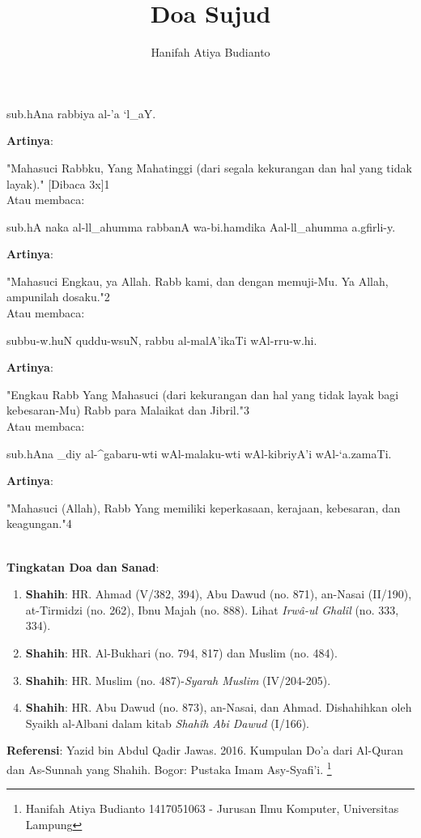\documentclass[a4paper,12pt]{article}
\title{\Large Doa Sujud}
\author{\calligra Hanifah Atiya Budianto}
\begin{document}
\sffamily
\maketitle 
\fullvocalize
{}
\begin{arabtext}
\noindent
sub.hAna rabbiya al-'a `l_aY.\\
\end{arabtext}
\noindent
\textbf{Artinya}:
\par
\indent
"Mahasuci Rabbku, Yang Mahatinggi (dari segala kekurangan dan hal yang 
tidak layak)." [Dibaca 3x]{\scriptsize 1}\\
\indent Atau membaca:
\begin{arabtext}
\noindent
sub.hA naka al-ll_ahumma rabbanA wa-bi.hamdika Aal-ll_ahumma a.gfirli-y.\\
\end{arabtext}
\noindent
\textbf{Artinya}:
\par
\indent
"Mahasuci Engkau, ya Allah. Rabb kami, dan dengan memuji-Mu. Ya Allah, 
ampunilah dosaku."{\scriptsize 2}\\
\indent Atau membaca:
\begin{arabtext}
\noindent
subbu-w.huN quddu-wsuN, rabbu al-malA'ikaTi wAl-rru-w.hi.\\
\end{arabtext}
\noindent
\textbf{Artinya}:
\par
\indent
"Engkau Rabb Yang Mahasuci (dari kekurangan dan hal yang tidak layak bagi 
kebesaran-Mu) Rabb para Malaikat dan Jibril."{\scriptsize 3}\\
\indent Atau membaca:
\begin{arabtext}
\noindent
sub.hAna _diy al-^gabaru-wti wAl-malaku-wti wAl-kibriyA'i wAl-`a.zamaTi.\\
\end{arabtext}
\noindent
\textbf{Artinya}:
\par
\indent
"Mahasuci (Allah), Rabb Yang memiliki keperkasaan, kerajaan, kebesaran, 
dan keagungan."{\scriptsize 4}\\\\
\par
\noindent
\textbf{Tingkatan Doa dan Sanad}:
\begin{enumerate}
\item \textbf{Shahih}: HR. Ahmad (V/382, 394), Abu Dawud (no. 871), 
an-Nasai (II/190), at-Tirmidzi (no. 262), Ibnu Majah (no. 888). Lihat 
\textit{Irw\^{a}-ul Ghal\^{i}l} (no. 333, 334).
\item \textbf{Shahih}: HR. Al-Bukhari (no. 794, 817) dan Muslim (no. 484).
\item \textbf{Shahih}: HR. Muslim (no. 487)-\textit{Syarah Muslim} 
(IV/204-205).
\item \textbf{Shahih}: HR. Abu Dawud (no. 873), an-Nasai, dan Ahmad. 
Dishahihkan oleh Syaikh al-Albani dalam kitab \textit{Shah\^{i}h Abi 
Dawud} (I/166).
\end{enumerate}
\textbf{Referensi}: Yazid bin Abdul Qadir Jawas. 2016. Kumpulan Do'a dari
Al-Quran dan As-Sunnah yang Shahih. Bogor: Pustaka Imam Asy-Syafi'i.
\footnote{Hanifah Atiya Budianto 1417051063 - Jurusan Ilmu Komputer,
Universitas Lampung}
\end{document}
